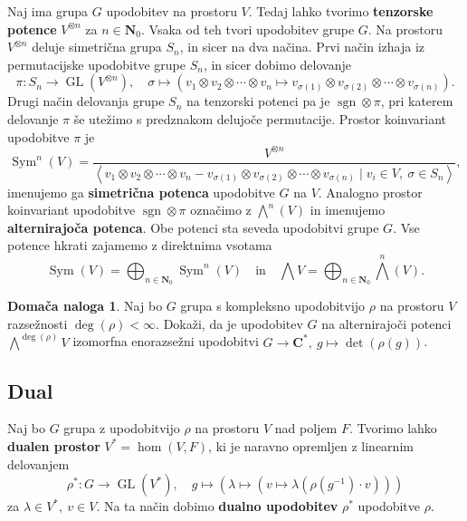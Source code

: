 \documentclass[11pt]{book}
\def\NN{\mathbf{N}}
\def\CC{\mathbf{C}}
\DeclareMathOperator\sgn{sgn}
\DeclareMathOperator\GL{GL}
\DeclareMathOperator\Sym{Sym}
\def\definicija{\color{rdeca}\bf}
\theoremstyle{definition}
\theoremstyle{zgled}
\theoremstyle{zgledbrezstevilke}
\theoremstyle{odprtproblem}
\theoremstyle{domacanaloga}
\newtheorem{domacanaloga}[theorem]{Domača naloga}
\theoremstyle{izrek}
\begin{document}
Naj ima grupa $G$ upodobitev na prostoru $V$. Tedaj lahko tvorimo {\definicija tenzorske potence} $V^{\otimes n}$ za $n \in \NN_0$. Vsaka od teh tvori upodobitev grupe $G$. Na prostoru $V^{\otimes n}$ deluje simetrična grupa $S_n$, in sicer na dva načina. Prvi način izhaja iz permutacijske upodobitve grupe $S_n$, in sicer dobimo delovanje
\[
    \pi \colon S_n \to \GL(V^{\otimes n}), \quad
    \sigma \mapsto \left( v_1 \otimes v_2 \otimes \cdots \otimes v_n \mapsto  v_{\sigma(1)} \otimes v_{\sigma(2)} \otimes \cdots \otimes v_{\sigma(n)} \right).
\]
Drugi način delovanja grupe $S_n$ na tenzorski potenci pa je $\sgn \otimes \pi$, pri katerem delovanje $\pi$ še utežimo s predznakom delujoče permutacije. Prostor koinvariant upodobitve $\pi$ je
\[
    {\textstyle \Sym^n(V)} =
    \frac{V^{\otimes n}}{
        \left\langle v_1 \otimes v_2 \otimes \cdots \otimes v_n -  v_{\sigma(1)} \otimes v_{\sigma(2)} \otimes \cdots \otimes v_{\sigma(n)} \mid v_i \in V, \ \sigma \in S_n \right\rangle
    },
\]
imenujemo ga {\definicija simetrična potenca} upodobitve $G$ na $V$. Analogno prostor koinvariant upodobitve $\sgn \otimes \pi$ označimo z $\bigwedge^n(V)$ in imenujemo {\definicija alternirajoča potenca}. Obe potenci sta seveda upodobitvi grupe $G$. Vse potence hkrati zajamemo z direktnima vsotama
\[
    \textstyle \Sym(V) = \bigoplus_{n \in \NN_0} \Sym^n(V) 
    \quad \text{in} \quad
    \bigwedge V = \bigoplus_{n \in \NN_0} \textstyle\bigwedge^n(V).
\]

\begin{domacanaloga}
Naj bo $G$ grupa s kompleksno upodobitvijo $\rho$ na prostoru $V$ razsežnosti $\deg(\rho) < \infty$. Dokaži, da je upodobitev $G$ na alternirajoči potenci $\bigwedge^{\deg(\rho)} V$ izomorfna enorazsežni upodobitvi $G \to \CC^*, \ g \mapsto \det(\rho(g))$.
\end{domacanaloga}

\subsection{Dual}

Naj bo $G$ grupa z upodobitvijo $\rho$ na prostoru $V$ nad poljem $F$. Tvorimo lahko {\definicija dualen prostor} $V^* = \hom(V, F)$, ki je naravno opremljen z linearnim delovanjem
\[
    \rho^* \colon G \to \GL(V^*), \quad
    g \mapsto \left( \lambda \mapsto \left( v \mapsto \lambda(\rho(g^{-1}) \cdot v) \right) \right)
\]
za $\lambda \in V^*, \ v \in V$. Na ta način dobimo {\definicija dualno upodobitev} $\rho^*$ upodobitve $\rho$. 
\end{document}
